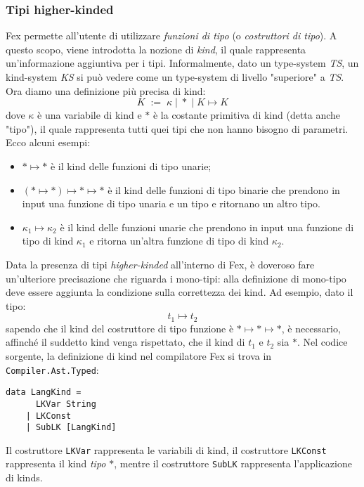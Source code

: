 \documentclass[10pt,a4paper]{article}
\begin{document}
\hypertarget{Tipi higher-kinded}{\subsubsection{Tipi higher-kinded}}
Fex permette all'utente di utilizzare \textit{funzioni di tipo} (o \textit{costruttori di tipo}). A questo scopo,
viene introdotta la nozione di \textit{kind}, il quale rappresenta un'informazione aggiuntiva per i tipi. Informalmente,
dato un type-system \textit{TS}, un kind-system \textit{KS} si può vedere come un type-system di livello "superiore"
a \textit{TS}. Ora diamo una definizione più precisa di kind:
\[ K \; := \; \kappa \; | \; * \; | \; K \mapsto K \]
dove $ \kappa $ è una variabile di kind e $ * $ è la costante primitiva di kind (detta anche "tipo"), il quale
rappresenta tutti quei tipi che non hanno bisogno di parametri. Ecco alcuni esempi:
\begin{itemize}
    \item $ * \mapsto * $ è il kind delle funzioni di tipo unarie;
    \item $ (* \mapsto *) \mapsto * \mapsto * $ è il kind delle funzioni di tipo binarie che prendono in input una
    funzione di tipo unaria e un tipo e ritornano un altro tipo.
    \item $ \kappa_1 \mapsto \kappa_2 $ è il kind delle funzioni unarie che prendono in input una funzione di tipo
    di kind $ \kappa_1 $ e ritorna un'altra funzione di tipo di kind $ \kappa_2 $.
\end{itemize}
Data la presenza di tipi \textit{higher-kinded} all'interno di Fex, è doveroso fare un'ulteriore precisazione che
riguarda i mono-tipi: alla definizione di mono-tipo deve essere aggiunta la condizione sulla correttezza dei kind.
Ad esempio, dato il tipo:
\[ t_1 \mapsto t_2 \]
sapendo che il kind del costruttore di tipo funzione è $ * \mapsto * \mapsto * $, è necessario, affinché il suddetto
kind venga rispettato, che il kind di $ t_1 $ e $ t_2 $ sia $ * $.
Nel codice sorgente, la definizione di kind nel compilatore Fex si trova in \texttt{Compiler.Ast.Typed}:
\begin{lstlisting}
data LangKind =
      LKVar String
    | LKConst
    | SubLK [LangKind]
\end{lstlisting}
Il costruttore \texttt{LKVar} rappresenta le variabili di kind, il costruttore \texttt{LKConst} rappresenta il kind
\textit{tipo} $ * $, mentre il costruttore \texttt{SubLK} rappresenta l'applicazione di kinds.
\end{document}
